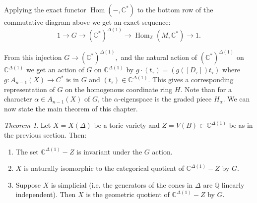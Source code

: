 \documentclass[BSc]{usydthesis}
\numberwithin{equation}{chapter}
\theoremstyle{remark}
\newtheorem{Theorem}[equation]{Theorem}
\newcommand{\C}{\mathbb{C}}
\newcommand{\Z}{\mathbb{Z}}
\begin{document}
Applying the exact functor $\operatorname{Hom}(-,\C^*)$ to the bottom row of the commutative diagram above we get an exact sequence: $$ 1 \to G \to (\C^*)^{\Delta(1)} \to \operatorname{Hom}_{\Z}(M,\C^*) \to 1.$$ 

From this injection $G\to (\C^*)^{\Delta(1)},$ and the natural action of $(\C^*)^{\Delta(1)}$ on $\C^{\Delta(1)}$ we get an action of $G$ on $\C^{\Delta(1)}$ by $g\cdot (t_{\tau}) = ( g([D_{\tau}]) t_{\tau} )$ where $g:A_{n-1}(X)\to C^*$ is in $G$ and $(t_{\tau})\in \C^{\Delta(1)}.$ This gives a corresponding representation of $G$ on the homogenous coordinate ring $H.$ Note than for a character $\alpha \in A_{n-1}(X)$ of $G$, the $\alpha$-eigenspace is the graded piece $H_{\alpha}.$ 
We can now state the main theorem of this chapter.

\begin{Theorem}
 Let $X=X(\Delta)$ be a toric variety and $Z = V(B)\subset \C^{\Delta(1)}$ be as in the previous section. Then:
 
 \begin{enumerate}
  \item The set $\C^{\Delta(1)}-Z$ is invariant under the $G$ action.
  \item $X$ is naturally isomorphic to the categorical quotient of $\C^{\Delta(1)}-Z$ by $G.$
  \item Suppose $X$ is simplicial (i.e. the generators of the cones in $\Delta$ are $\mathbb{Q}$ linearly independent). Then $X$ is the geometric quotient of $\C^{\Delta(1)}-Z$ by $G.$
 \end{enumerate}

\end{Theorem}
\end{document}
